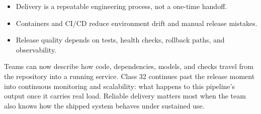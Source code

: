 \classclosingframe
{\begin{itemize}
\item Delivery is a repeatable engineering process, not a one-time handoff.
\item Containers and CI/CD reduce environment drift and manual release mistakes.
\item Release quality depends on tests, health checks, rollback paths, and observability.
\end{itemize}}
{Teams can now describe how code, dependencies, models, and checks travel from the repository into a running service.}
{Class 32 continues past the release moment into continuous monitoring and scalability: what happens to this pipeline's output once it carries real load.}
{Reliable delivery matters most when the team also knows how the shipped system behaves under sustained use.}


